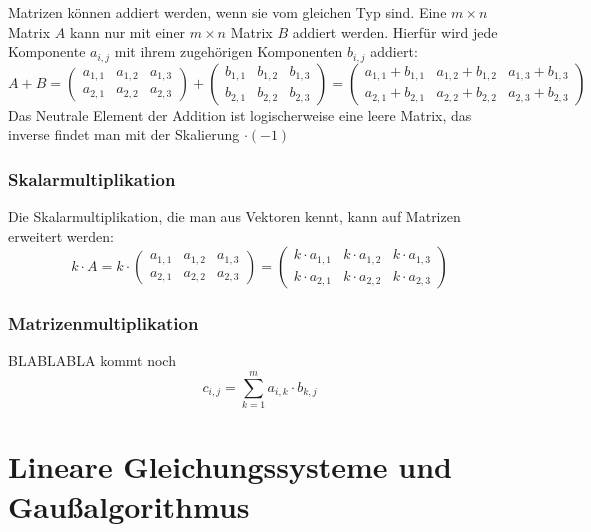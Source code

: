 \documentclass[../MAIN/main.tex]{subfiles}
\begin{document}
Matrizen können addiert werden, wenn sie vom gleichen Typ sind. Eine $m\times n$ Matrix $A$ kann nur mit einer $m\times n$ Matrix $B$ addiert werden. Hierfür wird jede Komponente $a_{i,j}$ mit ihrem zugehörigen Komponenten $b_{i,j}$ addiert:
$$A+B = \begin{pmatrix} a_{1,1} & a_{1,2} & a_{1,3} \\ a_{2,1} & a_{2,2} & a_{2,3} \end{pmatrix} + \begin{pmatrix} b_{1,1} & b_{1,2} & b_{1,3} \\ b_{2,1} & b_{2,2} & b_{2,3} \end{pmatrix}  =  \begin{pmatrix} a_{1,1} + b_{1,1} & a_{1,2} + b_{1,2} & a_{1,3} + b_{1,3} \\ a_{2,1} + b_{2,1} & a_{2,2} + b_{2,2} & a_{2,3} + b_{2,3} \end{pmatrix}$$
Das Neutrale Element der Addition ist logischerweise eine leere Matrix, das inverse findet man mit der Skalierung $\cdot (-1)$

\subsubsection{Skalarmultiplikation}

Die Skalarmultiplikation, die man aus Vektoren kennt, kann auf Matrizen erweitert werden:
$$k \cdot A = k \cdot \begin{pmatrix} a_{1,1} & a_{1,2} & a_{1,3} \\ a_{2,1} & a_{2,2} & a_{2,3} \end{pmatrix} = \begin{pmatrix} k \cdot a_{1,1} & k \cdot a_{1,2} & k \cdot a_{1,3} \\ k \cdot a_{2,1} & k \cdot a_{2,2} & k \cdot a_{2,3} \end{pmatrix} $$

\subsubsection{Matrizenmultiplikation}

BLABLABLA kommt noch $$c_{i,j} = \sum_{k=1}^{m} a_{i,k} \cdot b_{k,j}$$



	\section{Lineare Gleichungssysteme und Gaußalgorithmus}
\end{document}
